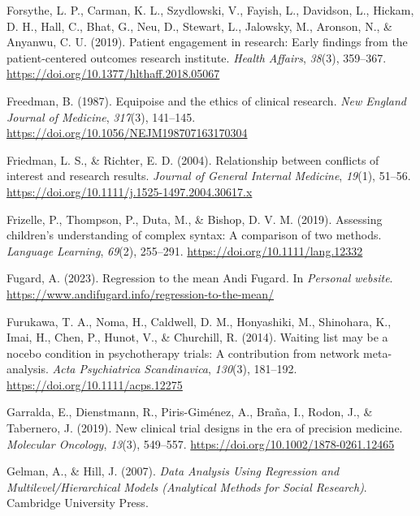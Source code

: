 \documentclass{krantz}
\newlength{\cslhangindent}
\newlength{\cslentryspacingunit} %
\newenvironment{CSLReferences}[2] %
{%
\setlength{\parindent}{0pt}
\ifodd #1
\let\oldpar\par
\def\par{\hangindent=\cslhangindent\oldpar}
\fi
\setlength{\parskip}{#2\cslentryspacingunit}
}%
{}
\begin{document}
\begin{CSLReferences}{1}{0}
\leavevmode{}%
Forsythe, L. P., Carman, K. L., Szydlowski, V., Fayish, L., Davidson, L., Hickam, D. H., Hall, C., Bhat, G., Neu, D., Stewart, L., Jalowsky, M., Aronson, N., \& Anyanwu, C. U. (2019). Patient engagement in research: {Early} findings from the patient-centered outcomes research institute. \emph{Health Affairs}, \emph{38}(3), 359--367. \url{https://doi.org/10.1377/hlthaff.2018.05067}

\leavevmode{}%
Freedman, B. (1987). Equipoise and the ethics of clinical research. \emph{New England Journal of Medicine}, \emph{317}(3), 141--145. \url{https://doi.org/10.1056/NEJM198707163170304}

\leavevmode{}%
Friedman, L. S., \& Richter, E. D. (2004). Relationship between conflicts of interest and research results. \emph{Journal of General Internal Medicine}, \emph{19}(1), 51--56. \url{https://doi.org/10.1111/j.1525-1497.2004.30617.x}

\leavevmode{}%
Frizelle, P., Thompson, P., Duta, M., \& Bishop, D. V. M. (2019). Assessing children's understanding of complex syntax: A comparison of two methods. \emph{Language Learning}, \emph{69}(2), 255--291. \url{https://doi.org/10.1111/lang.12332}

\leavevmode{}%
Fugard, A. (2023). Regression to the mean \textendash{} {Andi Fugard}. In \emph{Personal website}. \url{https://www.andifugard.info/regression-to-the-mean/}

\leavevmode{}%
Furukawa, T. A., Noma, H., Caldwell, D. M., Honyashiki, M., Shinohara, K., Imai, H., Chen, P., Hunot, V., \& Churchill, R. (2014). Waiting list may be a nocebo condition in psychotherapy trials: A contribution from network meta-analysis. \emph{Acta Psychiatrica Scandinavica}, \emph{130}(3), 181--192. \url{https://doi.org/10.1111/acps.12275}

\leavevmode{}%
Garralda, E., Dienstmann, R., Piris-Giménez, A., Braña, I., Rodon, J., \& Tabernero, J. (2019). New clinical trial designs in the era of precision medicine. \emph{Molecular Oncology}, \emph{13}(3), 549--557. \url{https://doi.org/10.1002/1878-0261.12465}

\leavevmode{}%
Gelman, A., \& Hill, J. (2007). \emph{Data {Analysis Using Regression} and {Multilevel}/{Hierarchical Models} ({Analytical Methods} for {Social Research})}. {Cambridge University Press}.


\end{CSLReferences}
\end{document}
